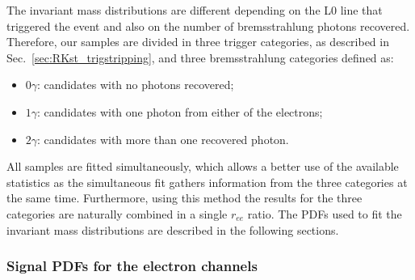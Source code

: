 The invariant mass distributions are different depending on the
L0 line that triggered the event and also on the number of bremsstrahlung photons recovered.
Therefore, our samples are divided in three trigger categories, as described in
Sec.~\ref{sec:RKst_trigstripping}, and three bremsstrahlung categories defined as:
%
\begin{itemize}
\item $0\gamma$: candidates with no photons recovered;
\item $1\gamma$: candidates with one photon from either of the electrons;
\item $2\gamma$: candidates with more than one recovered photon.
\end{itemize}
%
All samples are fitted simultaneously, which allows a better use of the available statistics 
as the simultaneous fit gathers information from the three categories at the same time.
Furthermore, using this method the results for the three categories are
naturally combined in a single $r_{ee}$ ratio.
%
The PDFs used to fit the invariant mass distributions are described in the following sections.



\subsubsection{Signal PDFs for the electron channels}
\label{sec:fit_ee_central}


